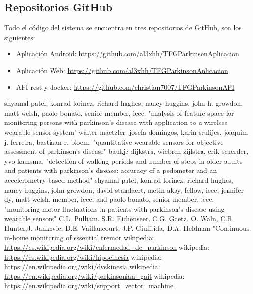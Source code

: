 \documentclass[11pt,spanish]{article}
\begin{document}
\subsection{Repositorios GitHub}
Todo el código del sistema se encuentra en tres repositorios de GitHub, son los siguientes:

\begin{itemize}
	\item Aplicación Android: \url {https://github.com/al3xhh/TFGParkinsonAplicacion}
    \item Aplicación Web: \url {https://github.com/al3xhh/TFGParkinsonAplicacion}
    \item API rest y docker: \url {https://github.com/christian7007/TFGParkinsonAPI}
\end{itemize}

\newpage
\begin{thebibliography}{15}
    shyamal patel, konrad lorincz, richard hughes, nancy huggins, john h. growdon, matt welsh, paolo bonato, senior member, ieee. "analysis of feature space for monitoring persons with parkinson’s disease with application to a wireless wearable sensor system"
    walter maetzler, josefa domingos, karin srulijes, joaquim j. ferreira, bastiaan r. bloem. "quantitative wearable sensors for objective assessment of parkinson’s disease"
    baukje dijkstra, wiebren zijlstra, erik scherder, yvo kamsma. "detection of walking periods and number of steps in older adults and patients with parkinson’s disease: accuracy of a pedometer and an accelerometry-based method"
    shyamal patel, konrad lorincz, richard hughes, nancy huggins, john growdon, david standaert, metin akay, fellow, ieee, jennifer dy, matt welsh, member, ieee, and paolo bonato, senior member, ieee. "monitoring motor fluctuations in patients with parkinson’s disease using wearable sensors"
    C.L. Pulliam, S.R. Eichenseer, C.G. Goetz, O. Waln, C.B. Hunter,J. Jankovic, D.E. Vaillancourt, J.P. Giuffrida, D.A. Heldman "Continuous in-home monitoring of essential tremor
     wikipedia: \url{https://es.wikipedia.org/wiki/enfermedad_de_parkinson}
     wikipedia: \url {https://es.wikipedia.org/wiki/hipocinesia}
     wikipedia: \url {https://en.wikipedia.org/wiki/dyskinesia}
     wikipedia: \url {https://en.wikipedia.org/wiki/parkinsonian_gait}
     wikipedia: \url {https://en.wikipedia.org/wiki/support_vector_machine}

\end{thebibliography}
\end{document}
